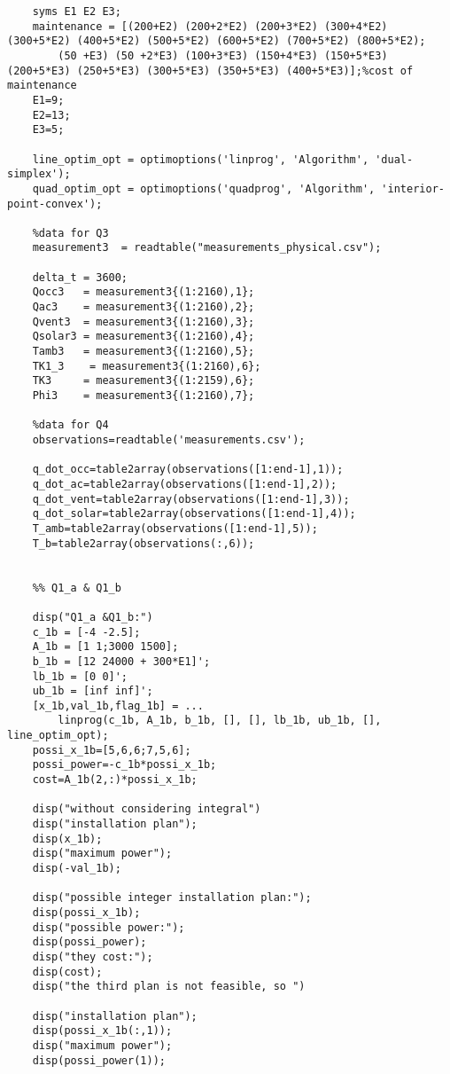 \documentclass[titlepage,a4paper]{article}
\begin{document}
\fi
\begin{lstlisting}
    


    syms E1 E2 E3;
    maintenance = [(200+E2) (200+2*E2) (200+3*E2) (300+4*E2) (300+5*E2) (400+5*E2) (500+5*E2) (600+5*E2) (700+5*E2) (800+5*E2);
        (50 +E3) (50 +2*E3) (100+3*E3) (150+4*E3) (150+5*E3) (200+5*E3) (250+5*E3) (300+5*E3) (350+5*E3) (400+5*E3)];%cost of maintenance
    E1=9;
    E2=13;
    E3=5;
    
    line_optim_opt = optimoptions('linprog', 'Algorithm', 'dual-simplex');
    quad_optim_opt = optimoptions('quadprog', 'Algorithm', 'interior-point-convex');
    
    %data for Q3
    measurement3  = readtable("measurements_physical.csv");
    
    delta_t = 3600;
    Qocc3   = measurement3{(1:2160),1};
    Qac3    = measurement3{(1:2160),2};
    Qvent3  = measurement3{(1:2160),3};
    Qsolar3 = measurement3{(1:2160),4};
    Tamb3   = measurement3{(1:2160),5};
    TK1_3    = measurement3{(1:2160),6};
    TK3     = measurement3{(1:2159),6};
    Phi3    = measurement3{(1:2160),7};
    
    %data for Q4
    observations=readtable('measurements.csv');
    
    q_dot_occ=table2array(observations([1:end-1],1));
    q_dot_ac=table2array(observations([1:end-1],2));
    q_dot_vent=table2array(observations([1:end-1],3));
    q_dot_solar=table2array(observations([1:end-1],4));
    T_amb=table2array(observations([1:end-1],5));
    T_b=table2array(observations(:,6));
    
    
    %% Q1_a & Q1_b
    
    disp("Q1_a &Q1_b:")
    c_1b = [-4 -2.5];
    A_1b = [1 1;3000 1500];
    b_1b = [12 24000 + 300*E1]';
    lb_1b = [0 0]';
    ub_1b = [inf inf]';
    [x_1b,val_1b,flag_1b] = ...
        linprog(c_1b, A_1b, b_1b, [], [], lb_1b, ub_1b, [], line_optim_opt);
    possi_x_1b=[5,6,6;7,5,6];
    possi_power=-c_1b*possi_x_1b;
    cost=A_1b(2,:)*possi_x_1b;
    
    disp("without considering integral")
    disp("installation plan");
    disp(x_1b);
    disp("maximum power");
    disp(-val_1b);
    
    disp("possible integer installation plan:");
    disp(possi_x_1b);
    disp("possible power:");
    disp(possi_power);
    disp("they cost:");
    disp(cost);
    disp("the third plan is not feasible, so ")
    
    disp("installation plan");
    disp(possi_x_1b(:,1));
    disp("maximum power");
    disp(possi_power(1));
    

\end{lstlisting}
\end{document}
